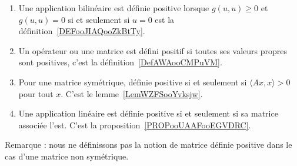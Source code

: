         \label{THEMEooYEVLooWotqMY}
\begin{enumerate}
    \item
        Une application bilinéaire est définie positive lorsque \( g(u,u)\geq 0\) et \( g(u,u)=0\) si et seulement si \( u=0\) est la définition~\ref{DEFooJIAQooZkBtTy}.
    \item
        Un opérateur ou une matrice est défini positif si toutes ses valeurs propres sont positives, c'est la définition~\ref{DefAWAooCMPuVM}.
    \item
        Pour une matrice symétrique, définie positive si et seulement si \( \langle Ax, x\rangle >0\) pour tout \( x\). C'est le lemme~\ref{LemWZFSooYvksjw}.
    \item
        Une application linéaire est définie positive si et seulement si sa matrice associée l'est. C'est la proposition~\ref{PROPooUAAFooEGVDRC}.
\end{enumerate}
Remarque : nous ne définissons pas la notion de matrice définie positive dans le cas d'une matrice non symétrique.

